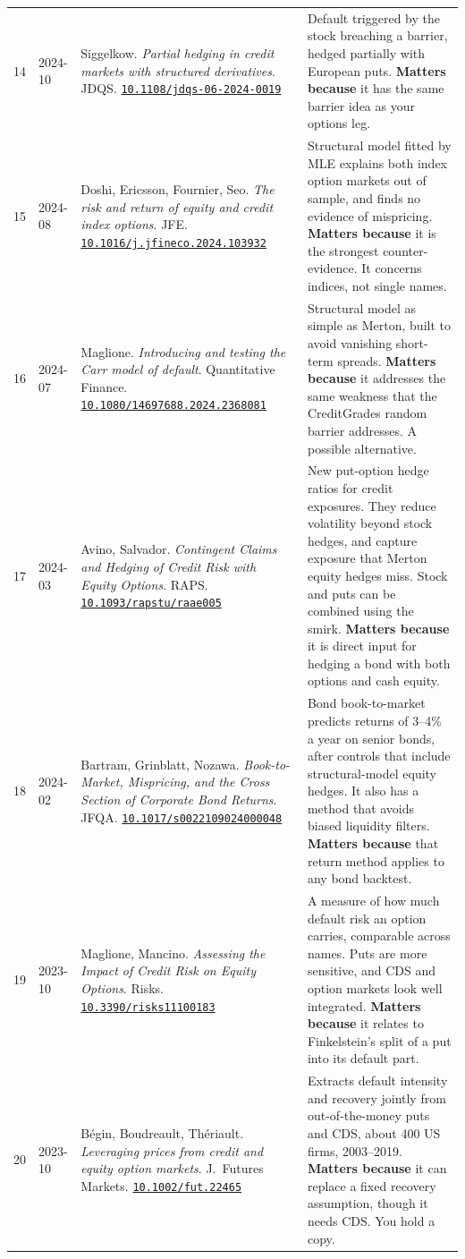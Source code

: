\documentclass[10pt,a4paper]{article}
\newcommand{\doi}[1]{\href{https://doi.org/#1}{\nolinkurl{#1}}}
\begin{document}
{\begin{longtable}{@{}P{0.5cm}P{1.3cm}P{5.6cm}P{9.2cm}@{}}
14 & 2024-10 & Siggelkow. \emph{Partial hedging in credit markets with structured derivatives}. JDQS. \doi{10.1108/jdqs-06-2024-0019} & Default triggered by the stock breaching a barrier, hedged partially with European puts. \textbf{Matters because} it has the same barrier idea as your options leg. \\
15 & 2024-08 & Doshi, Ericsson, Fournier, Seo. \emph{The risk and return of equity and credit index options}. JFE. \doi{10.1016/j.jfineco.2024.103932} & Structural model fitted by MLE explains both index option markets out of sample, and finds no evidence of mispricing. \textbf{Matters because} it is the strongest counter-evidence. It concerns indices, not single names. \\
16 & 2024-07 & Maglione. \emph{Introducing and testing the Carr model of default}. Quantitative Finance. \doi{10.1080/14697688.2024.2368081} & Structural model as simple as Merton, built to avoid vanishing short-term spreads. \textbf{Matters because} it addresses the same weakness that the CreditGrades random barrier addresses. A possible alternative. \\
17 & 2024-03 & Avino, Salvador. \emph{Contingent Claims and Hedging of Credit Risk with Equity Options}. RAPS. \doi{10.1093/rapstu/raae005} & New put-option hedge ratios for credit exposures. They reduce volatility beyond stock hedges, and capture exposure that Merton equity hedges miss. Stock and puts can be combined using the smirk. \textbf{Matters because} it is direct input for hedging a bond with both options and cash equity. \\
18 & 2024-02 & Bartram, Grinblatt, Nozawa. \emph{Book-to-Market, Mispricing, and the Cross Section of Corporate Bond Returns}. JFQA. \doi{10.1017/s0022109024000048} & Bond book-to-market predicts returns of 3--4\% a year on senior bonds, after controls that include structural-model equity hedges. It also has a method that avoids biased liquidity filters. \textbf{Matters because} that return method applies to any bond backtest. \\
19 & 2023-10 & Maglione, Mancino. \emph{Assessing the Impact of Credit Risk on Equity Options}. Risks. \doi{10.3390/risks11100183} & A measure of how much default risk an option carries, comparable across names. Puts are more sensitive, and CDS and option markets look well integrated. \textbf{Matters because} it relates to Finkelstein's split of a put into its default part. \\
20 & 2023-10 & B\'egin, Boudreault, Th\'eriault. \emph{Leveraging prices from credit and equity option markets}. J.\ Futures Markets. \doi{10.1002/fut.22465} & Extracts default intensity and recovery jointly from out-of-the-money puts and CDS, about 400 US firms, 2003--2019. \textbf{Matters because} it can replace a fixed recovery assumption, though it needs CDS. You hold a copy. \\
\bottomrule
\end{longtable}
}
\end{document}
